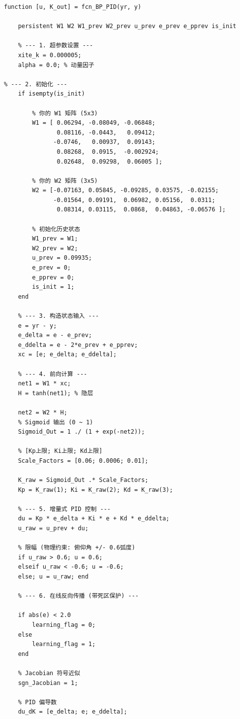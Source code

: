 \documentclass[UTF8, a4paper, 12pt]{ctexart}
\begin{document}
\begin{lstlisting}
function [u, K_out] = fcn_BP_PID(yr, y)

    persistent W1 W2 W1_prev W2_prev u_prev e_prev e_pprev is_init
    
    % --- 1. 超参数设置 ---
    xite_k = 0.000005; 
    alpha = 0.0; % 动量因子
    
% --- 2. 初始化 ---
    if isempty(is_init)
        
        % 你的 W1 矩阵 (5x3)
        W1 = [ 0.06294, -0.08049, -0.06848;
               0.08116, -0.0443,   0.09412;
              -0.0746,   0.00937,  0.09143;
               0.08268,  0.0915,  -0.002924;
               0.02648,  0.09298,  0.06005 ];

        % 你的 W2 矩阵 (3x5)
        W2 = [-0.07163, 0.05845, -0.09285, 0.03575, -0.02155;
              -0.01564, 0.09191,  0.06982, 0.05156,  0.0311;
               0.08314, 0.03115,  0.0868,  0.04863, -0.06576 ];

        % 初始化历史状态
        W1_prev = W1; 
        W2_prev = W2;
        u_prev = 0.09935; 
        e_prev = 0; 
        e_pprev = 0;
        is_init = 1;
    end
    
    % --- 3. 构造状态输入 ---
    e = yr - y; 
    e_delta = e - e_prev; 
    e_ddelta = e - 2*e_prev + e_pprev;
    xc = [e; e_delta; e_ddelta];
    
    % --- 4. 前向计算 ---
    net1 = W1 * xc;
    H = tanh(net1); % 隐层
    
    net2 = W2 * H;
    % Sigmoid 输出 (0 ~ 1)
    Sigmoid_Out = 1 ./ (1 + exp(-net2));
    
    % [Kp上限; Ki上限; Kd上限]
    Scale_Factors = [0.06; 0.0006; 0.01]; 
    
    K_raw = Sigmoid_Out .* Scale_Factors;
    Kp = K_raw(1); Ki = K_raw(2); Kd = K_raw(3);
    
    % --- 5. 增量式 PID 控制 ---
    du = Kp * e_delta + Ki * e + Kd * e_ddelta;
    u_raw = u_prev + du;
    
    % 限幅 (物理约束: 俯仰角 +/- 0.6弧度)
    if u_raw > 0.6; u = 0.6;
    elseif u_raw < -0.6; u = -0.6;
    else; u = u_raw; end
    
    % --- 6. 在线反向传播 (带死区保护) ---
    
    if abs(e) < 2.0
        learning_flag = 0;
    else
        learning_flag = 1;
    end
    
    % Jacobian 符号近似
    sgn_Jacobian = 1; 
    
    % PID 偏导数
    du_dK = [e_delta; e; e_ddelta];
    

\end{lstlisting}
\end{document}
